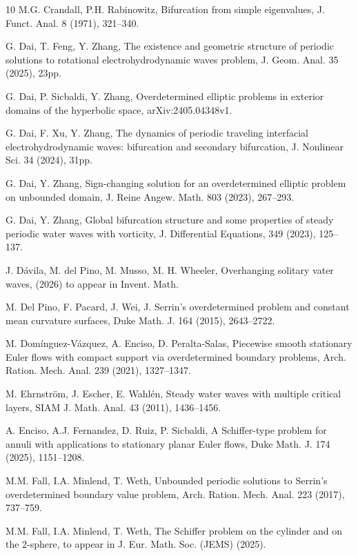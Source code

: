 \documentclass[reqno]{amsart}
\numberwithin{equation}{section}
\numberwithin{equation}{section}
\numberwithin{equation}{section}
\begin{document}
\begin{thebibliography}{10}
 M.G. Crandall, P.H. Rabinowitz, Bifurcation from simple eigenvalues, J. Funct. Anal. 8 (1971), 321--340.

G. Dai, T. Feng, Y. Zhang, The existence and geometric structure of periodic solutions to rotational electrohydrodynamic waves problem, J. Geom. Anal. 35 (2025), 23pp.


 G. Dai, P. Sicbaldi, Y. Zhang, Overdetermined elliptic problems in exterior domains of the hyperbolic space, arXiv:2405.04348v1.

G. Dai, F. Xu, Y. Zhang,
The dynamics of periodic traveling interfacial electrohydrodynamic waves: bifurcation and secondary bifurcation,
J. Nonlinear Sci. 34 (2024), 31pp.

 G. Dai, Y. Zhang, Sign-changing solution for an overdetermined elliptic problem on unbounded domain, J. Reine Angew. Math. 803 (2023), 267--293.

G. Dai, Y. Zhang, Global bifurcation structure and some properties of steady periodic water waves with vorticity,
J. Differential Equations, 349 (2023), 125--137.

 J. D\'{a}vila, M. del Pino, M. Musso, M. H. Wheeler, Overhanging solitary vater waves, (2026) to appear in Invent. Math.

 M. Del Pino, F. Pacard, J. Wei, J. Serrin's overdetermined problem and constant mean curvature
surfaces, Duke Math. J. 164 (2015), 2643--2722.


 M. Dom\'{i}nguez-V\'{a}zquez, A. Enciso, D. Peralta-Salas, Piecewise smooth stationary Euler flows with compact support via
overdetermined boundary problems, Arch. Ration. Mech. Anal. 239 (2021),
1327--1347.

M. Ehrnstr\"{o}m, J. Escher, E. Wahl\'{e}n, Steady water waves with multiple critical layers, SIAM J. Math. Anal. 43 (2011), 1436--1456.

 A. Enciso, A.J. Fernandez, D. Ruiz, P. Sicbaldi, A Schiffer-type problem for annuli with applications to stationary planar Euler flows, Duke Math. J. 174 (2025), 1151--1208.


 M.M. Fall, I.A. Minlend, T. Weth, Unbounded periodic solutions to Serrin's overdetermined boundary value problem, Arch. Ration. Mech. Anal. 223 (2017), 737--759.


 M.M. Fall, I.A. Minlend, T. Weth, The Schiffer problem on the cylinder and on the 2-sphere, to appear in J. Eur.
Math. Soc. (JEMS) (2025).


\end{thebibliography}
\end{document}
